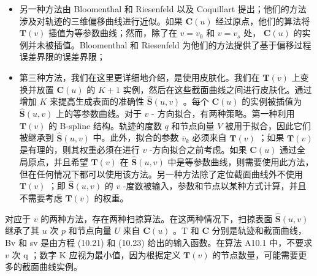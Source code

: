 \documentclass[../main.tex]{subfiles}
\begin{document}
\begin{itemize}
\item 另一种方法由 Bloomenthal 和 Riesenfeld \cite{Blom91} 以及 Coquillart \cite{Coqu87a} 提出；他们的方法涉及对轨迹的三维偏移曲线进行近似。如果 \(\mathbf{C}\left( u\right)\) 经过原点，他们的算法将 \(\mathbf{T}\left( v\right)\) 插值为等参数曲线；然而，除了在 \(v = {v}_{0}\) 和 \(v = {v}_{s}\) 处， \(\mathbf{C}\left( u\right)\) 的实例并未被插值。Bloomenthal 和 Riesenfeld 为他们的方法提供了基于偏移过程误差界限的误差界限；
\end{itemize}

\begin{itemize}
\item 第三种方法，我们在这里更详细地介绍，是使用皮肤化。我们在 \(\mathbf{T}\left( v\right)\) 上变换并放置 \(\mathbf{C}\left( u\right)\) 的 \(K + 1\) 实例，然后在这些截面曲线之间进行皮肤化。通过增加 \(K\) 来提高生成表面的准确性 \(\widehat{\mathbf{S}}\left( {u,v}\right)\) 。每个 \(\mathbf{C}\left( u\right)\) 的实例被插值为 \(\widehat{\mathbf{S}}\left( {u,v}\right)\) 上的等参数曲线。对于 \(v\) - 方向拟合，有两种策略。第一种利用 \(\mathbf{T}\left( v\right)\) 的 B-spline 结构。轨迹的度数 \(q\) 和节点向量 \(V\) 被用于拟合，因此它们被继承到 \(\widehat{\mathbf{S}}\left( {u,v}\right)\) 中。此外，拟合的参数 \({\bar{v}}_{k}\) 必须来自 \(\mathbf{T}\left( v\right)\) ；如果 \(\mathbf{T}\left( v\right)\) 是有理的，则其权重必须在进行 \(v\) -方向拟合之前考虑。如果 \(\mathbf{C}\left( u\right)\) 通过全局原点，并且希望 \(\mathbf{T}\left( v\right)\) 在 \(\widehat{\mathbf{S}}\left( {u,v}\right)\) 中是等参数曲线，则需要使用此方法，但在任何情况下都可以使用该方法。另一种方法除了定位截面曲线外不使用 \(\mathbf{T}\left( v\right)\) ；即 \(\widehat{\mathbf{S}}\left( {u,v}\right)\) 的 \(v\) -度数被输入，参数和节点以某种方式计算，并且不需要考虑 \(\mathbf{T}\left( v\right)\) 的权重。
\end{itemize}

对应于 \(v\) 的两种方法，存在两种扫掠算法。在这两种情况下，扫掠表面 \(\widehat{\mathbf{S}}\left( {u,v}\right)\) 继承了其 \(u\) 次 \(p\) 和节点向量 \(U\) 来自 \(\mathbf{C}\left( u\right)\) 。T 和 \(\mathbf{C}\) 分别是轨迹和截面曲线，Bv 和 sv 是由方程 (10.21) 和 (10.23) 给出的输入函数。在算法 A10.1 中，不要求 \(v\) 次 \(\mathrm{q}\) ；数字 \(\mathrm{K}\) 应视为最小值，因为根据定义 \(\mathbf{T}\left( v\right)\) 的节点数量，可能需要更多的截面曲线实例。
\end{document}
